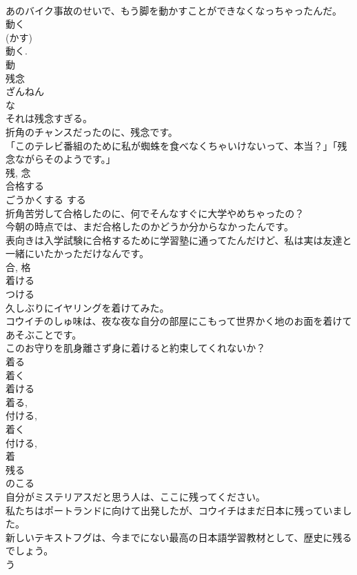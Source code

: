 \documentclass[8pt]{extreport}
\begin{document}
\begin{CJK}{UTF8}{min}
\\	あのバイク事故のせいで、もう脚を動かすことができなくなっちゃったんだ。	
\\	動く 
\\	(かす) 
\\	動く. 
\\	動	
\\	残念	
\\	ざんねん	
\\	な 
\\	それは残念すぎる。	
\\	折角のチャンスだったのに、残念です。	
\\	「このテレビ番組のために私が蜘蛛を食べなくちゃいけないって、本当？」「残念ながらそのようです。」	
\\	残, 念	
\\	合格する	
\\	ごうかくする	する 
\\	折角苦労して合格したのに、何でそんなすぐに大学やめちゃったの？	
\\	今朝の時点では、まだ合格したのかどうか分からなかったんです。	
\\	表向きは入学試験に合格するために学習塾に通ってたんだけど、私は実は友達と一緒にいたかっただけなんです。	
\\	合, 格	
\\	着ける	
\\	つける	
\\	久しぶりにイヤリングを着けてみた。	
\\	コウイチのしゅ味は、夜な夜な自分の部屋にこもって世界かく地のお面を着けてあそぶことです。	
\\	このお守りを肌身離さず身に着けると約束してくれないか？	
\\	着る 
\\	着く 
\\	着ける 
\\	着る, 
\\	付ける, 
\\	着く
\\	付ける, 
\\	着	
\\	残る	
\\	のこる	
\\	自分がミステリアスだと思う人は、ここに残ってください。	
\\	私たちはポートランドに向けて出発したが、コウイチはまだ日本に残っていました。	
\\	新しいテキストフグは、今までにない最高の日本語学習教材として、歴史に残るでしょう。	
\\	う 

\end{CJK}
\end{document}
